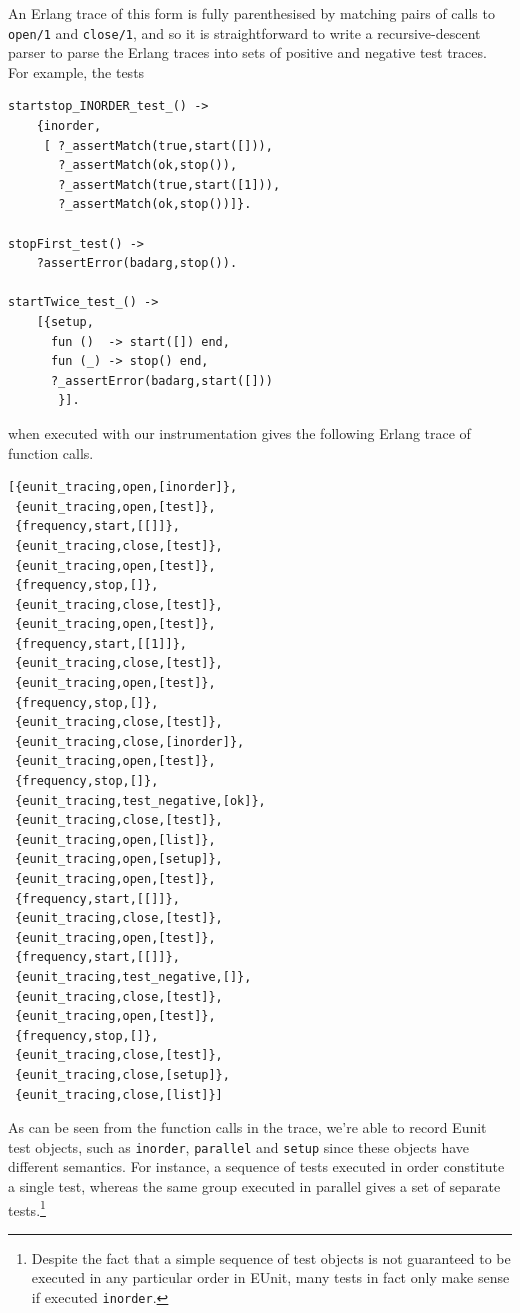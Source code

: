 \documentclass[]{sigplanconf}
\begin{document}
An Erlang trace of this form is fully parenthesised by matching pairs of calls to \texttt{open/1} and \texttt{close/1}, and so it is straightforward to write a recursive-descent parser to parse the Erlang traces into sets of positive and negative test traces. For example, the tests
\begin{verbatim}
startstop_INORDER_test_() ->
    {inorder,
     [ ?_assertMatch(true,start([])),
       ?_assertMatch(ok,stop()),
       ?_assertMatch(true,start([1])),
       ?_assertMatch(ok,stop())]}.

stopFirst_test() ->
    ?assertError(badarg,stop()).

startTwice_test_() ->
    [{setup,
      fun ()  -> start([]) end,       
      fun (_) -> stop() end,         
      ?_assertError(badarg,start([]))  
       }].
\end{verbatim}
when executed with our instrumentation gives the following Erlang trace of function calls.
\begin{verbatim}
[{eunit_tracing,open,[inorder]},
 {eunit_tracing,open,[test]},
 {frequency,start,[[]]},
 {eunit_tracing,close,[test]},
 {eunit_tracing,open,[test]},
 {frequency,stop,[]},
 {eunit_tracing,close,[test]},
 {eunit_tracing,open,[test]},
 {frequency,start,[[1]]},
 {eunit_tracing,close,[test]},
 {eunit_tracing,open,[test]},
 {frequency,stop,[]},
 {eunit_tracing,close,[test]},
 {eunit_tracing,close,[inorder]},
 {eunit_tracing,open,[test]},
 {frequency,stop,[]},
 {eunit_tracing,test_negative,[ok]},
 {eunit_tracing,close,[test]},
 {eunit_tracing,open,[list]},
 {eunit_tracing,open,[setup]},
 {eunit_tracing,open,[test]},
 {frequency,start,[[]]},
 {eunit_tracing,close,[test]},
 {eunit_tracing,open,[test]},
 {frequency,start,[[]]},
 {eunit_tracing,test_negative,[]},
 {eunit_tracing,close,[test]},
 {eunit_tracing,open,[test]},
 {frequency,stop,[]},
 {eunit_tracing,close,[test]},
 {eunit_tracing,close,[setup]},
 {eunit_tracing,close,[list]}]
\end{verbatim}
As can be seen from the function calls in the trace, we're able to record Eunit test objects, such as \texttt{inorder}, \texttt{parallel} and \texttt{setup} since these objects have different semantics. For instance, a sequence of tests executed in order constitute a single test, whereas the same group executed in parallel gives a set of separate tests.\footnote{Despite the fact that a simple sequence of test objects is not guaranteed to be executed in any particular order in EUnit, many tests in fact only make sense if executed \texttt{inorder}.}
\end{document}

